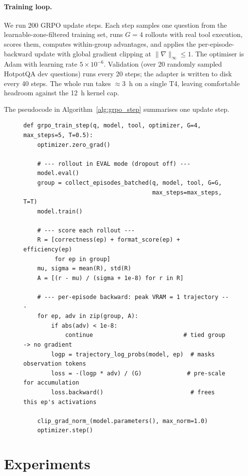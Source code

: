 \documentclass[11pt]{article}
\begin{document}
\paragraph{Training loop.}
We run 200 GRPO update steps. Each step samples one question from the
learnable-zone-filtered training set, runs $G=4$ rollouts with real
tool execution, scores them, computes within-group advantages, and
applies the per-episode-backward update with global gradient
clipping at $\|\nabla\|_\infty \le 1$. The optimiser is Adam with
learning rate $5 \times 10^{-6}$. Validation (over 20 randomly
sampled HotpotQA dev questions) runs every 20 steps; the adapter is
written to disk every 40 steps. The whole run takes $\approx$3~h on
a single T4, leaving comfortable headroom against the 12~h kernel
cap.

The pseudocode in Algorithm~\ref{alg:grpo_step} summarises one update
step.

\begin{figure}[t]
\begin{lstlisting}[caption={One multi-turn GRPO update step with real tool
execution and per-episode backward.},label={alg:grpo_step},captionpos=b]
def grpo_train_step(q, model, tool, optimizer, G=4, max_steps=5, T=0.5):
    optimizer.zero_grad()

    # --- rollout in EVAL mode (dropout off) ---
    model.eval()
    group = collect_episodes_batched(q, model, tool, G=G,
                                     max_steps=max_steps, T=T)
    model.train()

    # --- score each rollout ---
    R = [correctness(ep) + format_score(ep) + efficiency(ep)
         for ep in group]
    mu, sigma = mean(R), std(R)
    A = [(r - mu) / (sigma + 1e-8) for r in R]

    # --- per-episode backward: peak VRAM = 1 trajectory ---
    for ep, adv in zip(group, A):
        if abs(adv) < 1e-8:
            continue                          # tied group -> no gradient
        logp = trajectory_log_probs(model, ep)  # masks observation tokens
        loss = -(logp * adv) / (G)             # pre-scale for accumulation
        loss.backward()                         # frees this ep's activations

    clip_grad_norm_(model.parameters(), max_norm=1.0)
    optimizer.step()
\end{lstlisting}
\end{figure}

\section{Experiments}
\label{sec:experiments}
\end{document}
